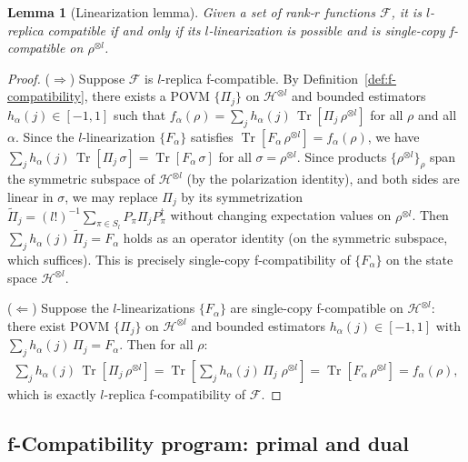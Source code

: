 \documentclass[aps,%
twocolumn,%
floatfix,%
pra,%
amsfonts,%
groupedaddress,%
superscriptaddress]{revtex4-2}%
\newtheorem{lemma}{Lemma}
\DeclareMathOperator{\tr}{Tr}
\newcommand{\ox}{\otimes}
\newcommand{\1}{\mathbbm{1}}
\newcommand*{\cF}{\mathcal{F}}
\newcommand*{\cH}{\mathcal{H}}
\begin{document}
\begin{lemma}[Linearization lemma]\label{lem:structure_fcomp_lemma}
Given a set of rank-$r$ functions $\mathcal{F}$, it is $l$-replica compatible if and only if its $l$-linearization is possible and is single-copy f-compatible on $\rho^{\otimes l}$.
\end{lemma}
\begin{proof}
    \color{red}
    ($\Rightarrow$) Suppose $\cF$ is $l$-replica f-compatible. By Definition~\ref{def:f-compatibility}, there exists a POVM $\{\Pi_j\}$ on $\cH^{\ox l}$ and bounded estimators $h_\alpha(j) \in [-1,1]$ such that $f_\alpha(\rho) = \sum_j h_\alpha(j)\,\tr[\Pi_j\,\rho^{\ox l}]$ for all $\rho$ and all $\alpha$. Since the $l$-linearization $\{F_\alpha\}$ satisfies $\tr[F_\alpha\,\rho^{\ox l}] = f_\alpha(\rho)$, we have $\sum_j h_\alpha(j)\,\tr[\Pi_j\,\sigma] = \tr[F_\alpha\,\sigma]$ for all $\sigma = \rho^{\ox l}$.
    Since products $\{\rho^{\ox l}\}_\rho$ span the symmetric subspace of $\cH^{\ox l}$ (by the polarization identity), and both sides are linear in $\sigma$, we may replace $\Pi_j$ by its symmetrization $\tilde{\Pi}_j = (l!)^{-1}\sum_{\pi \in S_l} P_\pi \Pi_j P_\pi^\dagger$ without changing expectation values on $\rho^{\ox l}$. Then $\sum_j h_\alpha(j)\,\tilde{\Pi}_j = F_\alpha$ holds as an operator identity (on the symmetric subspace, which suffices). This is precisely single-copy f-compatibility of $\{F_\alpha\}$ on the state space $\cH^{\ox l}$.

    ($\Leftarrow$) Suppose the $l$-linearizations $\{F_\alpha\}$ are single-copy f-compatible on $\cH^{\ox l}$: there exist POVM $\{\Pi_j\}$ on $\cH^{\ox l}$ and bounded estimators $h_\alpha(j) \in [-1,1]$ with $\sum_j h_\alpha(j)\,\Pi_j = F_\alpha$. Then for all $\rho$:
    \begin{align}
    \sum_j h_\alpha(j)\,\tr[\Pi_j\,\rho^{\ox l}] = \tr\!\left[\sum_j h_\alpha(j)\,\Pi_j\;\rho^{\ox l}\right] = \tr[F_\alpha\,\rho^{\ox l}] = f_\alpha(\rho),
    \end{align}
    which is exactly $l$-replica f-compatibility of $\cF$.
    \color{black}
\end{proof}

\subsection{f-Compatibility program: primal and dual}
\end{document}
